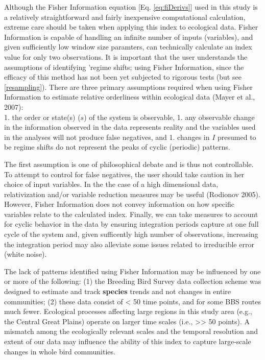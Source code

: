 \documentclass[12pt,twoside,openany]{reedthesis}
\begin{document}
Although the Fisher Information equation {[}Eq. \eqref{eq:fiDerivs}{]} used in this study is a relatively straightforward and fairly inexpensive computational calculation, extreme care should be taken when applying this index to ecological data. Fisher Information is capable of handling an infinite number of inputs (variables), and given sufficiently low window size paramters, can technically calculate an index value for only two observations. It is important that the user understands the assumptions of identifying 'regime shifts; using Fisher Information, since the efficacy of this method has not been yet subjected to rigorous tests (but see \ref{resampling}). There are three primary assumptions required when using Fisher Information to estimate relative orderliness within ecological data (Mayer et al., 2007):\\
1. the order or state(s) (\(s\)) of the system is observable,
1. any observable change in the information observed in the data represents reality and the variables used in the analyses will not produce false negatives, and
1. changes in \(I\) presumed to be regime shifts do not represent the peaks of cyclic (periodic) patterns.

The first assumption is one of philosophical debate and is thus not controllable. To attempt to control for false negatives, the user should take caution in her choice of input variables. In the the case of a high dimensional data, relativization and/or variable reduction measures may be useful (Rodionov 2005). However, Fisher Information does not convey information on how specific variables relate to the calculated index. Finally, we can take measures to account for cyclic behavior in the data by ensuring integration periods capture at one full cycle of the system and, given sufficently high number of observations, increasing the integration period may also alleviate some issues related to irreducible error (white noise).

The lack of patterns identified using Fisher Information may be influenced by one or more of the following: (1) the Breeding Bird Survey data collection scheme was designed to estimate and track \textbf{species} trends and not changes in entire communities; (2) these data consist of \textless{} 50 time points, and for some BBS routes much fewer. Ecological processes affecting large regions in this study area (e.g., the Central Great Plains) operate on larger time scales (i.e., \textgreater\textgreater{} 50 points). A mismatch among the ecologically relevant scales and the temporal resolution and extent of our data may influence the ability of this index to capture large-scale changes in whole bird communities.
\end{document}
